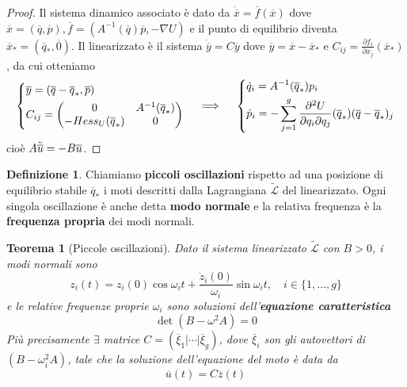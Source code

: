 \documentclass{book}
\theoremstyle{plain}
\newtheorem{teo}{Teorema}[chapter]
\theoremstyle{plain}
\theoremstyle{plain}
\theoremstyle{plain}
\theoremstyle{plain}
\theoremstyle{definition}
\newtheorem{defi}{Definizione}[chapter]
\theoremstyle{remark}
\theoremstyle{definition}
\begin{document}
\begin{proof}
    Il sistema dinamico associato è dato da $\Dot{\overline{x}}=\overline{f}(\overline{x})$ dove $\overline{x}=(\overline{q}, \overline{p}), \overline{f}=\left(A^{-1}(\overline{q})\overline{p}, -\nabla U\right)$ e il punto di equilibrio diventa $\overline{x}_*=(\overline{q}_*,\overline{0})$. Il linearizzato è il sistema $\Dot{\overline{y}}=C\overline{y}$ dove $\overline{y}=\overline{x}-\overline{x}_*$ e $C_{ij}=\frac{\partial f_i}{\partial x_j}(\overline{x}_*)$, da cui otteniamo
    \begin{displaymath}
        \begin{dcases}
            \overline{y}=(\overline{q}-\overline{q}_*, \overline{p}) \\
            C_{ij}=\begin{pmatrix}
                0 & A^{-1}(\overline{q}_*)\\
                -Hess_U(\overline{q}_*) & 0
            \end{pmatrix}
        \end{dcases}
        \quad\implies\quad
        \begin{dcases}
            \Dot{q}_i=A^{-1}(\overline{q}_*)p_i \\
            \Dot{p}_i=-\sum_{j=1}^g\frac{\partial^2U}{\partial q_i\partial q_j}(\overline{q}_*)(\overline{q}-\overline{q}_*)_j
        \end{dcases}
    \end{displaymath}
    cioè $A\Ddot{\overline{u}}= -B\overline{u}$.
\end{proof}

\begin{defi}
    Chiamiamo \textbf{piccoli oscillazioni} rispetto ad una posizione di equilibrio stabile $\overline{q}_*$ i moti descritti dalla Lagrangiana $\widetilde{\mathcal{L}}$ del linearizzato. Ogni singola oscillazione è anche detta \textbf{modo normale} e la relativa frequenza è la \textbf{frequenza propria} dei modi normali.
\end{defi}

\begin{teo}[Piccole oscillazioni]
    Dato il sistema linearizzato $\widetilde{\mathcal{L}}$ con $B>0$, i modi normali sono
    \begin{displaymath}
        \boxed{
        z_i(t)=z_i(0)\cos\omega_it+\frac{\dot{z}_i(0)}{\omega_i}\sin\omega_it, \quad i\in\{1,\ldots,g\}
        }
    \end{displaymath}
    e le relative frequenze proprie $\omega_i$ sono soluzioni dell'\textbf{equazione caratteristica}
    \begin{displaymath}
        \boxed{
        \det(B-\omega^2A)=0
        }
    \end{displaymath}
    Più precisamente $\exists$ matrice $C=\left(\overline{\xi}_1|\cdots|\overline{\xi}_g\right)$, dove $\overline{\xi}_i$ son gli autovettori di  $(B-\omega_i^2A)$, tale che  la soluzione dell'equazione del moto è data da
    \begin{displaymath}
        \boxed{
        \overline{u}(t)=C\overline{z}(t)
        }
    \end{displaymath}
\end{teo}
\end{document}
